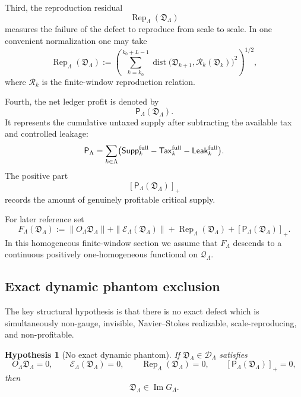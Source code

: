 \documentclass[11pt]{article}
\numberwithin{equation}{section}
\newtheorem{hypothesis}[theorem]{Hypothesis}
\begin{document}
Third, the reproduction residual
\[
        \operatorname{Rep}_\Lambda(\mathfrak D_\Lambda)
\]
measures the failure of the defect to reproduce from scale to scale.  In
one convenient normalization one may take
\[
        \operatorname{Rep}_\Lambda(\mathfrak D_\Lambda)
        :=
        \left(
        \sum_{k=k_0}^{k_0+L-1}
        \operatorname{dist}
        \bigl(
        \mathfrak D_{k+1},\mathcal R_k(\mathfrak D_k)
        \bigr)^2
        \right)^{1/2},
\]
where \(\mathcal R_k\) is the finite-window reproduction relation.

Fourth, the net ledger profit is denoted by
\[
        \mathsf P_\Lambda(\mathfrak D_\Lambda).
\]
It represents the cumulative untaxed supply after subtracting the
available tax and controlled leakage:
\[
        \mathsf P_\Lambda
        =
        \sum_{k\in\Lambda}
        \bigl(
        \mathsf{Supp}^{\rm full}_k
        -
        \mathsf{Tax}^{\rm full}_k
        -
        \mathsf{Leak}^{\rm full}_k
        \bigr).
\]
The positive part
\[
        [\mathsf P_\Lambda(\mathfrak D_\Lambda)]_+
\]
records the amount of genuinely profitable critical supply.

For later reference set
\[
        F_\Lambda(\mathfrak D_\Lambda)
        :=
        \|O_\Lambda\mathfrak D_\Lambda\|
        +
        \|\mathcal E_\Lambda(\mathfrak D_\Lambda)\|
        +
        \operatorname{Rep}_\Lambda(\mathfrak D_\Lambda)
        +
        [\mathsf P_\Lambda(\mathfrak D_\Lambda)]_+ .
\]
In this homogeneous finite-window section we assume that \(F_\Lambda\)
descends to a continuous positively one-homogeneous functional on
\(\mathcal Q_\Lambda\).

\subsection{Exact dynamic phantom exclusion}

The key structural hypothesis is that there is no exact defect which is
simultaneously non-gauge, invisible, Navier--Stokes realizable,
scale-reproducing, and non-profitable.

\begin{hypothesis}[No exact dynamic phantom]
\label{hyp:no-exact-dynamic-phantom}
If \(\mathfrak D_\Lambda\in\mathcal D_\Lambda\) satisfies
\[
        O_\Lambda\mathfrak D_\Lambda=0,
        \qquad
        \mathcal E_\Lambda(\mathfrak D_\Lambda)=0,
        \qquad
        \operatorname{Rep}_\Lambda(\mathfrak D_\Lambda)=0,
        \qquad
        [\mathsf P_\Lambda(\mathfrak D_\Lambda)]_+=0,
\]
then
\[
        \mathfrak D_\Lambda\in\operatorname{Im}G_\Lambda .
\]
\end{hypothesis}
\end{document}
